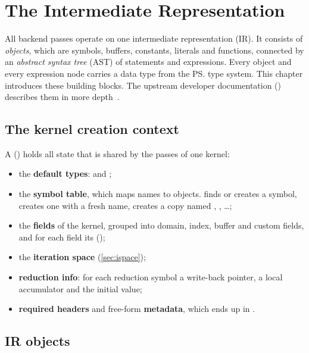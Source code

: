 \chapter{The Intermediate Representation}\label{ch:ir}

All backend passes operate on one intermediate representation (IR). It consists of
\emph{objects}, which are symbols, buffers, constants, literals and functions, connected
by an \emph{abstract syntax tree} (AST) of statements and expressions. Every object and
every expression node carries a data type from the \ps{} type system. This chapter
introduces these building blocks. The upstream developer documentation
() describes them in more depth~\cite{pystencils-docs}.

\section{The kernel creation context}

A  () holds all state
that is shared by the passes of one kernel:
\begin{itemize}
  \item the \textbf{default types}:  and ;
  \item the \textbf{symbol table}, which maps names to  objects.
         finds or creates a symbol,
         creates one with a fresh name,
         creates a copy named , , \dots;
  \item the \textbf{fields} of the kernel, grouped into domain, index, buffer and custom
        fields, and for each field its  ();
  \item the \textbf{iteration space} (\cref{sec:ispace});
  \item \textbf{reduction info}: for each reduction symbol a write-back pointer, a local
        accumulator and the initial value;
  \item \textbf{required headers} and free-form \textbf{metadata}, which ends up in
        .
\end{itemize}


\section{IR objects}

